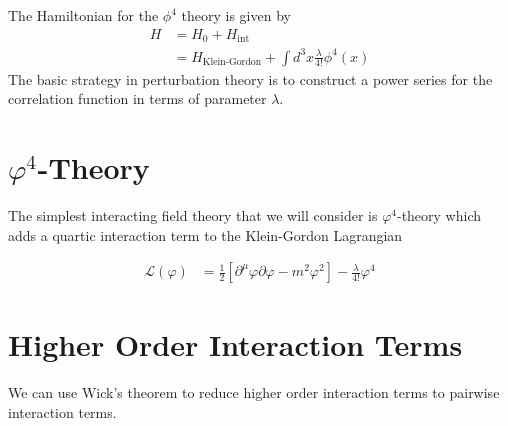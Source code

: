 \documentclass[book.tex]{subfiles}
\begin{document}
The Hamiltonian for the $\phi^4$ theory is given by
\begin{align}
    H &= H_0 + H_{\textrm{int}} \\
    &= H_{\textrm{Klein-Gordon}} + \int d^3 x \frac{\lambda}{4!} \phi^4(x) 
\end{align}
The basic strategy in perturbation theory is to construct a power series for the correlation function in terms of parameter $\lambda$.

\section{$\varphi^4$-Theory}

The simplest interacting field theory that we will consider is $\varphi^4$-theory which adds a quartic interaction term to the Klein-Gordon Lagrangian

\begin{align}
    \mathcal{L}(\varphi) &= \frac{1}{2}[\partial^\mu \varphi \partial \varphi - m^2 \varphi^2] - \frac{\lambda}{4!}\varphi^4
\end{align}

\section{Higher Order Interaction Terms}

We can use Wick's theorem to reduce higher order interaction terms to pairwise interaction terms.
\end{document}

